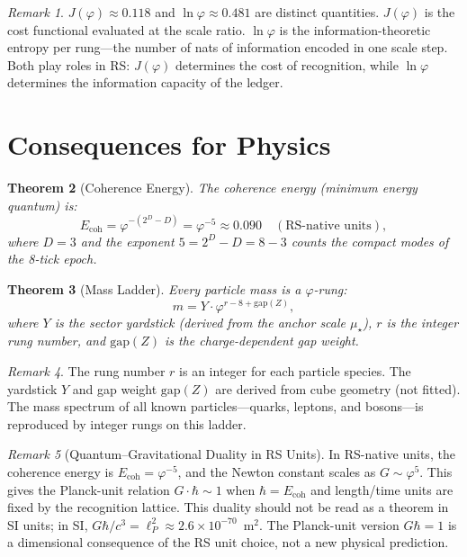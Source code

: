 \documentclass[12pt,a4paper]{article}
\newtheorem{theorem}{Theorem}[section]
\theoremstyle{definition}
\theoremstyle{remark}
\newtheorem{remark}[theorem]{Remark}
\begin{document}
\begin{remark}
$J(\varphi) \approx 0.118$ and $\ln\varphi \approx 0.481$ are
distinct quantities.  $J(\varphi)$ is the cost functional
evaluated at the scale ratio.  $\ln\varphi$ is the
information-theoretic entropy per rung---the number of nats of
information encoded in one scale step.  Both play roles in RS:
$J(\varphi)$ determines the cost of recognition, while
$\ln\varphi$ determines the information capacity of the ledger.
\end{remark}

\section{Consequences for Physics}
\label{sec:consequences}

\begin{theorem}[Coherence Energy]
\label{thm:ecoh}
The coherence energy (minimum energy quantum) is:
\begin{equation}
  E_{\mathrm{coh}} = \varphi^{-(2^D - D)} = \varphi^{-5}
  \approx 0.090 \quad (\text{RS-native units}),
\end{equation}
where $D = 3$ and the exponent $5 = 2^D - D = 8 - 3$ counts
the compact modes of the 8-tick epoch.
\end{theorem}

\begin{theorem}[Mass Ladder]
\label{thm:mass}
Every particle mass is a $\varphi$-rung:
\begin{equation}
  m = Y \cdot \varphi^{r - 8 + \mathrm{gap}(Z)},
\end{equation}
where $Y$ is the sector yardstick (derived from the anchor
scale $\mu_\star$), $r$ is the integer rung number, and
$\mathrm{gap}(Z)$ is the charge-dependent gap weight.
\end{theorem}

\begin{remark}
The rung number $r$ is an integer for each particle species.
The yardstick $Y$ and gap weight $\mathrm{gap}(Z)$ are derived
from cube geometry (not fitted).  The mass spectrum of all known
particles---quarks, leptons, and bosons---is reproduced by
integer rungs on this ladder.
\end{remark}

\begin{remark}[Quantum--Gravitational Duality in RS Units]
\label{rem:duality}
In RS-native units, the coherence energy is
$E_{\mathrm{coh}} = \varphi^{-5}$, and the Newton constant
scales as $G \sim \varphi^{5}$.  This gives the Planck-unit
relation $G \cdot \hbar \sim 1$ when $\hbar = E_{\mathrm{coh}}$
and length/time units are fixed by the recognition lattice.
This duality should not be read as a theorem in SI units;
in SI, $G\hbar/c^3 = \ell_P^2 \approx 2.6 \times 10^{-70}$~m$^2$.
The Planck-unit version $G\hbar = 1$ is a dimensional consequence
of the RS unit choice, not a new physical prediction.
\end{remark}
\end{document}
